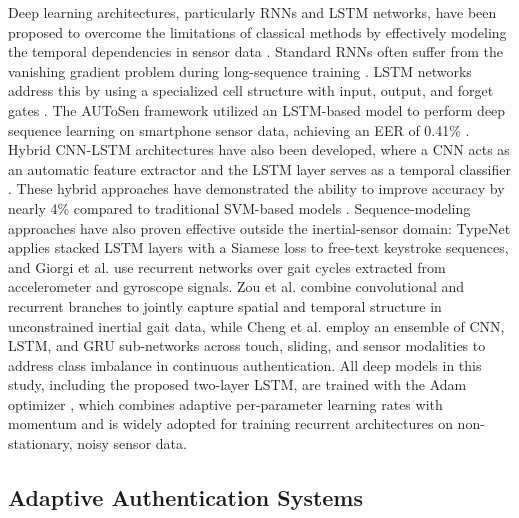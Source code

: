 \documentclass[3p,times,procedia]{elsarticle}
\begin{document}
Deep learning architectures, particularly RNNs and LSTM
networks, have been proposed to overcome the limitations of
classical methods by effectively modeling the temporal
dependencies in sensor data \cite{cao_user_2022}. Standard RNNs
often suffer from the vanishing gradient problem during
long-sequence training \cite{kasprowski_biometric_2022}. LSTM networks
address this by using a specialized cell structure with input,
output, and forget gates \cite{hochreiter_long_1997}. The AUToSen
framework utilized an LSTM-based model to perform deep sequence
learning on smartphone sensor data, achieving an EER of 0.41\%
\cite{abuhamad_autosen_2020}. Hybrid CNN-LSTM architectures have
also been developed, where a CNN acts as an automatic feature
extractor and the LSTM layer serves as a temporal classifier
\cite{zeng_gait-based_2021}. These hybrid approaches have demonstrated
the ability to improve accuracy by nearly 4\% compared to
traditional SVM-based models \cite{zeng_gait-based_2021}.
Sequence-modeling approaches have also proven effective outside
the inertial-sensor domain: TypeNet \cite{acien_typenet_2021}
applies stacked LSTM layers with a Siamese loss to free-text
keystroke sequences, and Giorgi et al. \cite{giorgi_using_2021}
use recurrent networks over gait cycles extracted from
accelerometer and gyroscope signals. Zou et al.
\cite{zou_deep_2020} combine convolutional and recurrent
branches to jointly capture spatial and temporal structure in
unconstrained inertial gait data, while Cheng et al.
\cite{cheng_continuous_2026} employ an ensemble of CNN, LSTM,
and GRU sub-networks across touch, sliding, and sensor
modalities to address class imbalance in continuous
authentication. All deep models in this study, including the
proposed two-layer LSTM, are trained with the Adam optimizer
\cite{kingma_adam_2015}, which combines adaptive per-parameter
learning rates with momentum and is widely adopted for training
recurrent architectures on non-stationary, noisy sensor data.

\subsection{Adaptive Authentication Systems}
\end{document}
